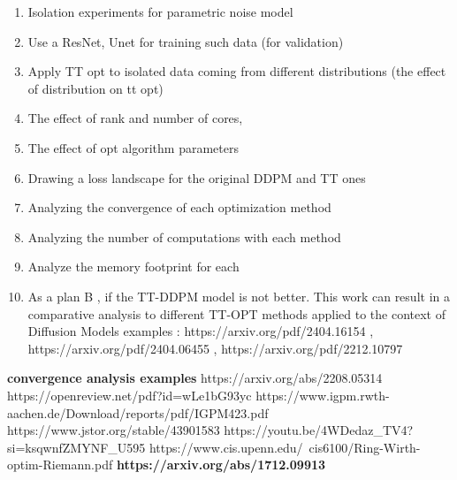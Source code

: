 \documentclass[11pt]{article}
\begin{document}
    \begin{enumerate}
        \item Isolation experiments for parametric noise model
        \item Use a ResNet, Unet for training such data (for validation)
        \item Apply TT opt to isolated data coming from different distributions (the effect of distribution on tt opt)
        \item The effect of rank and number of cores,
        \item The effect of opt algorithm parameters
        \item Drawing a loss landscape for the original DDPM and TT ones
        \item Analyzing the convergence of each optimization method
        \item Analyzing the number of computations with each method
        \item Analyze the memory footprint for each
        \item As a plan B , if the TT-DDPM model is not better.
        This work can result in a comparative analysis to different TT-OPT methods applied to the context of Diffusion Models
        examples : https://arxiv.org/pdf/2404.16154 , https://arxiv.org/pdf/2404.06455 , https://arxiv.org/pdf/2212.10797

    \end{enumerate}
    \textbf{convergence analysis examples}
    https://arxiv.org/abs/2208.05314
    https://openreview.net/pdf?id=wLe1bG93yc
    https://www.igpm.rwth-aachen.de/Download/reports/pdf/IGPM423.pdf
    https://www.jstor.org/stable/43901583
    https://youtu.be/4WDedaz_TV4?si=ksqwnfZMYNF_U595
    https://www.cis.upenn.edu/~cis6100/Ring-Wirth-optim-Riemann.pdf
    \textbf{https://arxiv.org/abs/1712.09913}
\end{document}
